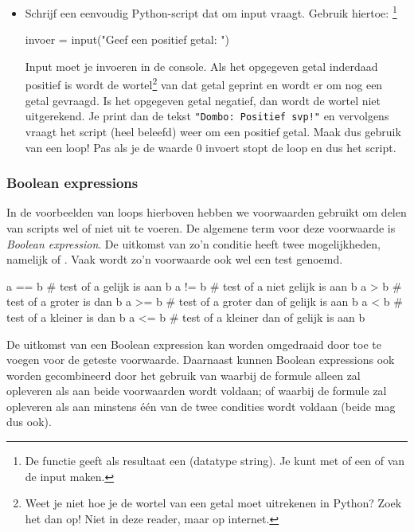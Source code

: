 \documentclass[a4paper,11pt, fleqn]{article}
\begin{document}
\begin{itemize}
\item Schrijf een eenvoudig Python-script dat om input vraagt. Gebruik hiertoe: \footnote{De functie  geeft als resultaat een  (datatype string). Je kunt met  of  een  of  van de input maken.}
\begin{python}
invoer = input("Geef een positief getal: ")
\end{python}
Input moet je invoeren in de console. Als het opgegeven getal inderdaad positief is wordt de wortel\footnote{Weet je niet hoe je de wortel van een getal moet uitrekenen in Python? Zoek het dan op! Niet in deze reader, maar op internet.} van dat getal geprint en wordt er om nog een getal gevraagd. 
Is het opgegeven getal negatief, dan wordt de wortel niet uitgerekend. Je print dan de tekst \verb."Dombo: Positief svp!". en vervolgens vraagt het script (heel beleefd) weer om een positief getal. Maak dus gebruik van een loop! Pas als je de waarde 0 invoert stopt de loop en dus het script.
\end{itemize}

\subsubsection{Boolean expressions}
In de voorbeelden van loops hierboven hebben we voorwaarden gebruikt om delen van scripts wel of niet uit te voeren. De algemene term voor deze voorwaarde is \textit{Boolean expression}. De uitkomst van zo'n conditie heeft twee mogelijkheden, namelijk  of . Vaak wordt zo'n voorwaarde ook wel een test genoemd.

\begin{python}
a == b	# test of a gelijk is aan b
a != b	# test of a niet gelijk is aan b
a > b	# test of a groter is dan b
a >= b	# test of a groter dan of gelijk is aan b
a < b	# test of a kleiner is dan b
a <= b	# test of a kleiner dan of gelijk is aan b
\end{python}

De uitkomst van een Boolean expression kan worden omgedraaid door  toe te voegen voor de geteste voorwaarde. Daarnaast kunnen Boolean expressions ook worden gecombineerd door het gebruik van  waarbij de formule alleen   zal opleveren als aan beide voorwaarden wordt voldaan; of  waarbij de formule  zal opleveren als aan minstens \'e\'en van de twee condities wordt voldaan (beide mag dus ook).
\end{document}
